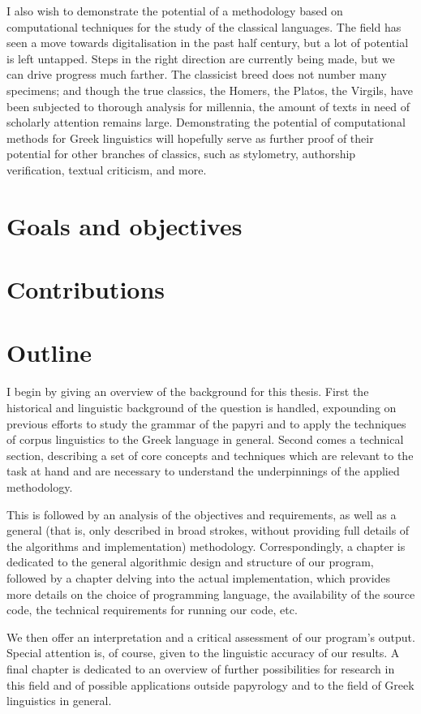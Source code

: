 I also wish to demonstrate the potential of a methodology based on
computational techniques for the study of the classical languages. The
field has seen a move towards digitalisation in the past half century,
but a lot of potential is left untapped. Steps in the right direction
are currently being made, but we can drive progress much farther. The
classicist breed does not number many specimens; and though the true
classics, the Homers, the Platos, the Virgils, have been subjected to
thorough analysis for millennia, the amount of texts in need of
scholarly attention remains large. Demonstrating the potential of
computational methods for Greek linguistics will hopefully serve as
further proof of their potential for other branches of classics, such
as stylometry, authorship verification, textual criticism, and more.

\section{Goals and objectives}



\section{Contributions}

\section{Outline}

I begin by giving an overview of the background for this thesis.
First the historical and linguistic background of the question is
handled, expounding on previous efforts to study the grammar of the
papyri and to apply the techniques of corpus linguistics to the Greek
language in general. Second comes a technical section, describing a
set of core concepts and techniques which are relevant to the task at
hand and are necessary to understand the underpinnings of the applied
methodology.

This is followed by an analysis of the objectives and requirements, as
well as a general (that is, only described in broad strokes, without
providing full details of the algorithms and implementation)
methodology. Correspondingly, a chapter is dedicated to the general
algorithmic design and structure of our program, followed by a chapter
delving into the actual implementation, which provides more details on
the choice of programming language, the availability of the source
code, the technical requirements for running our code, etc.

We then offer an interpretation and a critical assessment of our
program's output. Special attention is, of course, given to the
linguistic accuracy of our results. A final chapter is dedicated to an
overview of further possibilities for research in this field and of
possible applications outside papyrology and to the field of Greek
linguistics in general.
